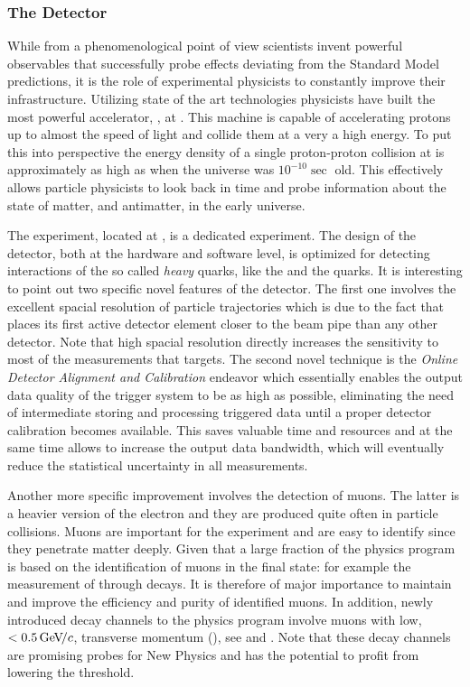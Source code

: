 \subsubsection{The \lhcb Detector}
While from a phenomenological point of view scientists invent powerful observables that successfully probe
effects deviating from the Standard Model predictions, it is the role of experimental physicists to
constantly improve their infrastructure. Utilizing state of the art technologies physicists have
built the most powerful accelerator, \lhc, at \cern. This machine is capable of accelerating protons
up to almost the speed of light and collide them at a very a high energy. To put this into perspective
the energy density of a single proton-proton collision at \lhc is approximately as high as when the
universe was $10^{-10} \sec$ old. This effectively allows particle physicists to look back in time and
probe information about the state of matter, and antimatter, in the early universe.

The \lhcb experiment, located at \cern, is a dedicated experiment. The design of the detector,
both at the hardware and software level, is optimized for detecting interactions of the so called
{\it heavy} quarks, like the \bquark and the \cquark quarks. It is interesting to point out two specific
novel features of the detector. The first one involves the excellent spacial resolution of particle
trajectories which is due to the fact that \lhcb places its first active detector element closer
to the \lhc beam pipe than any other detector. Note that high spacial resolution directly increases
the sensitivity to most of the measurements that \lhcb targets. The second novel technique is the
{\it Online Detector Alignment and Calibration} endeavor which essentially enables the output data
quality of the trigger system to be as high as possible, eliminating the need of intermediate storing
and processing triggered data until a proper detector calibration becomes available.
This saves valuable time and resources and at the same time allows to increase the output data bandwidth,
which will eventually reduce the statistical uncertainty in all \lhcb measurements.

Another more specific improvement involves the detection of muons. The latter is a heavier version of
the electron and they are produced quite often in particle collisions. Muons are important for the \lhcb
experiment and are easy to identify since they penetrate matter deeply. Given that a large fraction of
the \lhcb physics program is based on the identification of muons in the final state: for example the
measurement of \phis through \BsJpsiPhi decays. It is therefore of major importance to maintain and
improve the efficiency and purity of identified muons. In addition, newly introduced decay channels
to the \lhcb physics program involve muons with low, $<0.5 {\mathrm{\,Ge\kern -0.1em V\!/}c}$, transverse momentum (\pt), see
\cite{LHCB-CONF-2016-013-001} and \cite{LHCb-CONF-2016-012}. Note that these decay channels are
promising probes for New Physics and \lhcb has the potential to profit from lowering the \pt threshold.

